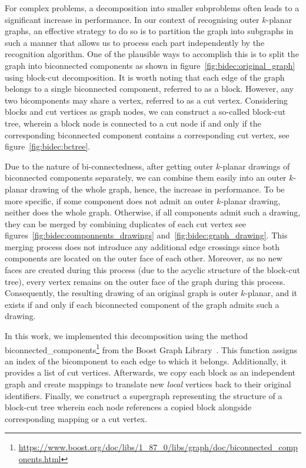 For complex problems, a decomposition into smaller subproblems often leads to a significant increase in performance. In our context of recognising outer \(k\)-planar graphs, an effective strategy to do so is to partition the graph into subgraphs in such a manner that allows us to process each part independently by the recognition algorithm. One of the plausible ways to accomplish this is to split the graph into biconnected components as shown in figure~\ref{fig:bidec:original_graph} using block-cut decomposition. It is worth noting that each edge of the graph belongs to a single biconnected component, referred to as a block. However, any two bicomponents may share a vertex, referred to as a cut vertex. Considering blocks and cut vertices as graph nodes, we can construct a so-called block-cut tree, wherein a block node is connected to a cut node if and only if the corresponding biconnected component contains a corresponding cut vertex, see figure~\ref{fig:bidec:bctree}.

Due to the nature of bi-connectedness, after getting outer \(k\)-planar drawings of biconnected components separately, we can combine them easily into an outer \(k\)-planar drawing of the whole graph, hence,  the increase in performance. To be more specific, if some component does not admit an outer \(k\)-planar drawing, neither does the whole graph. Otherwise, if all components admit such a drawing, they can be merged by combining duplicates of each cut vertex see figures~\ref{fig:bidec:componnents_drawings} and~\ref{fig:bidec:graph_drawing}. This merging process does not introduce any additional edge crossings since both components are located on the outer face of each other. Moreover, as no new faces are created during this process (due to the acyclic structure of the block-cut tree), every vertex remains on the outer face of the graph during this process. Consequently, the resulting drawing of an original graph is outer \(k\)-planar, and it exists if and only if each biconnected component of the graph admits such a drawing.

In this work, we implemented this decomposition using the method \textsf{bi\-connec\-ted\_compo\-nents}\footnote{\url{https://www.boost.org/doc/libs/1_87_0/libs/graph/doc/biconnected_components.html}} from the Boost Graph Library~\cite{boost}. This function assigns an index of the bicomponent to each edge to which it belongs. Additionally, it provides a list of cut vertices. Afterwards, we copy each block as an independent graph and create mappings to translate new \emph{local} vertices back to their original identifiers. Finally, we construct a supergraph representing the structure of a block-cut tree wherein each node references a copied block alongside corresponding mapping or a cut vertex.

